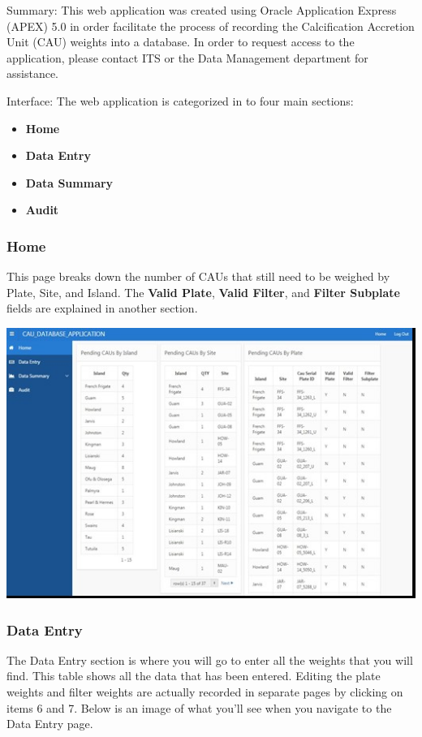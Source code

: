 \documentclass[
]{book}
\providecommand{\tightlist}{%
  \setlength{\itemsep}{0pt}\setlength{\parskip}{0pt}}
\begin{document}
Summary: This web application was created using Oracle Application Express (APEX) 5.0 in order facilitate the process of recording the Calcification Accretion Unit (CAU) weights into a database. In order to request access to the application, please contact ITS or the Data Management department for assistance.

Interface: The web application is categorized in to four main sections:

\begin{itemize}
\tightlist
\item
  \textbf{Home}
\item
  \textbf{Data Entry}
\item
  \textbf{Data Summary}
\item
  \textbf{Audit}
\end{itemize}

\hypertarget{home}{%
\subsubsection{Home}\label{home}}

This page breaks down the number of CAUs that still need to be weighed by Plate, Site, and Island. The
\textbf{Valid Plate}, \textbf{Valid Filter}, and \textbf{Filter Subplate} fields are explained in another section.

\includegraphics{images/Data1.jpg}

\hypertarget{data-entry}{%
\subsubsection{Data Entry}\label{data-entry}}

The Data Entry section is where you will go to enter all the weights that you will find. This table shows all the data that has been entered. Editing the plate weights and filter weights are actually recorded in separate pages by clicking on items 6 and 7. Below is an image of what you'll see when you navigate to the Data Entry page.
\end{document}
